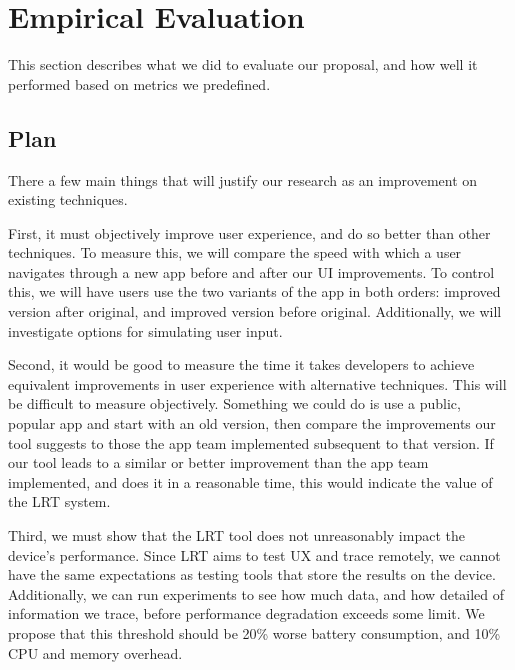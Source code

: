 \section{Empirical Evaluation}
\label{section:evaluation}
This section describes what we did to evaluate our proposal, and how well it performed
based on metrics we predefined.

\subsection{Plan}
There a few main things that will justify our research as an improvement on existing techniques.

First, it must objectively improve user experience, and do so better than other techniques.
To measure this, we will compare the speed with which a user navigates through a new app
before and after our UI improvements. To control this, we will have users use the two variants
of the app in both orders: improved version after original, and improved version before original.
Additionally, we will investigate options for simulating user input.

Second, it would be good to measure the time it takes developers to achieve equivalent
improvements in user experience with alternative techniques. This will be difficult to
measure objectively. Something we could do is use a public, popular app and start with
an old version, then compare the improvements our tool suggests to those the app team
implemented subsequent to that version. If our tool leads to a similar or better improvement
than the app team implemented, and does it in a reasonable time, this would indicate the
value of the LRT system.

Third, we must show that the LRT tool does not unreasonably impact the device's performance.
Since LRT aims to test UX and trace remotely, we cannot have the same expectations as testing
tools that store the results on the device. Additionally, we can run experiments to see how
much data, and how detailed of information we trace, before performance degradation exceeds
some limit. We propose that this threshold should be 20\% worse battery consumption, and 10\%
CPU and memory overhead.

